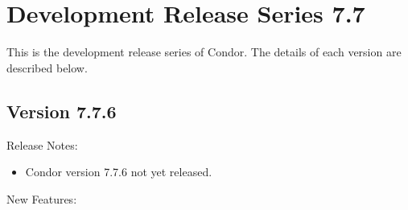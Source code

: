 
\section{\label{sec:History-7-7}Development Release Series 7.7}

This is the development release series of Condor.
The details of each version are described below.

\subsection*{\label{sec:New-7-7-6}Version 7.7.6}

\noindent Release Notes:

\begin{itemize}

\item Condor version 7.7.6 not yet released.

\end{itemize}


\noindent New Features:


